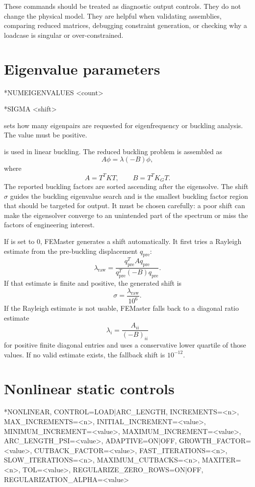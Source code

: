 These commands should be treated as diagnostic output controls. They do not change the physical model. They are helpful when validating assemblies, comparing reduced matrices, debugging constraint generation, or checking why a loadcase is singular or over-constrained.

\section{Eigenvalue parameters}

\begin{syntax}
*NUMEIGENVALUES
<count>

*SIGMA
<shift>
\end{syntax}

 sets how many eigenpairs are requested for eigenfrequency or buckling analysis. The value must be positive.

 is used in linear buckling. The reduced buckling problem is assembled as
\[
A \phi = \lambda (-B)\phi ,
\]
where
\[
A = T^T K T,\qquad B = T^T K_G T .
\]
The reported buckling factors are sorted ascending after the eigensolve. The shift \(\sigma\) guides the buckling eigenvalue search and is the smallest buckling factor region that should be targeted for output. It must be chosen carefully: a poor shift can make the eigensolver converge to an unintended part of the spectrum or miss the factors of engineering interest.

If  is set to 0, FEMaster generates a shift automatically. It first tries a Rayleigh estimate from the pre-buckling displacement \(q_\mathrm{pre}\):
\[
\lambda_\mathrm{raw}
=
\frac{q_\mathrm{pre}^T A q_\mathrm{pre}}
       {q_\mathrm{pre}^T (-B) q_\mathrm{pre}} .
\]
If that estimate is finite and positive, the generated shift is
\[
\sigma = \frac{\lambda_\mathrm{raw}}{10^6}.
\]
If the Rayleigh estimate is not usable, FEMaster falls back to a diagonal ratio estimate
\[
\lambda_i = \frac{A_{ii}}{(-B)_{ii}}
\]
for positive finite diagonal entries and uses a conservative lower quartile of those values. If no valid estimate exists, the fallback shift is \(10^{-12}\).

\section{Nonlinear static controls}
\label{sec:nonlinear-controls}

\begin{syntax}
*NONLINEAR, CONTROL=LOAD|ARC_LENGTH,
  INCREMENTS=<n>, MAX_INCREMENTS=<n>,
  INITIAL_INCREMENT=<value>, MINIMUM_INCREMENT=<value>,
  MAXIMUM_INCREMENT=<value>, ARC_LENGTH_PSI=<value>,
  ADAPTIVE=ON|OFF, GROWTH_FACTOR=<value>,
  CUTBACK_FACTOR=<value>, FAST_ITERATIONS=<n>,
  SLOW_ITERATIONS=<n>, MAXIMUM_CUTBACKS=<n>,
  MAXITER=<n>, TOL=<value>,
  REGULARIZE_ZERO_ROWS=ON|OFF,
  REGULARIZATION_ALPHA=<value>
\end{syntax}

